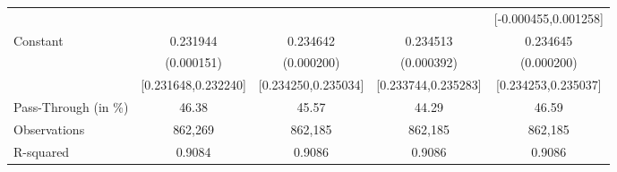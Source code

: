 {\begin{tabular}{l*{4}{c}}
                    &                     &                     &                     &[-0.000455,0.001258]         \\
Constant            &    0.231944\sym{***}&    0.234642\sym{***}&    0.234513\sym{***}&    0.234645\sym{***}\\
                    &  (0.000151)         &  (0.000200)         &  (0.000392)         &  (0.000200)         \\
                    &[0.231648,0.232240]         &[0.234250,0.235034]         &[0.233744,0.235283]         &[0.234253,0.235037]         \\
\midrule
Pass-Through (in \%)&       46.38         &       45.57         &       44.29         &       46.59         \\
Observations        &     862,269         &     862,185         &     862,185         &     862,185         \\
R-squared           &      0.9084         &      0.9086         &      0.9086         &      0.9086         \\
\bottomrule
\end{tabular}
}
